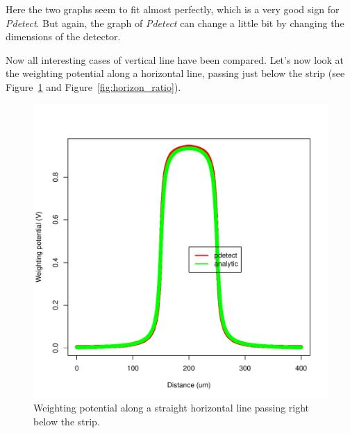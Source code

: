 \documentclass[11pt]{article}
\begin{document}
	Here the two graphs seem to fit almost perfectly, which is a very good sign for \textit{Pdetect}.
	But again, the graph of \textit{Pdetect} can change a little bit by changing the dimensions
	of the detector.

	Now all interesting cases of vertical line have been compared. Let's now look at the weighting potential
	along a horizontal line, passing just below the strip (see Figure~\ref{fig:horizon} and
	Figure~\ref{fig:horizon_ratio}).

	\begin{figure}[H]
		\begin{minipage}[b]{.46\linewidth}
			\center
			\includegraphics[scale=0.5]{images/annexe/horizon-top.pdf}
			\caption{Weighting potential along a straight horizontal line passing right below the strip.}
			\label{fig:horizon}
		\end{minipage} \hfill
		\begin{minipage}[b]{.46\linewidth}
			\center

\end{minipage}
\end{figure}
\end{document}
